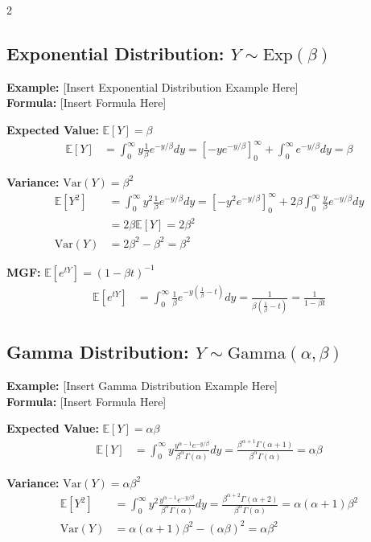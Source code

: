 \documentclass[11pt, letterpaper]{article}
\theoremstyle{definition}
\theoremstyle{remark}
\newcommand{\E}{\mathbb{E}}
\begin{document}
\begin{multicols*}{2}
\subsection{Exponential Distribution: $Y \sim \text{Exp}(\beta)$}
\textbf{Example:} [Insert Exponential Distribution Example Here] \\
\textbf{Formula:} [Insert Formula Here]

\textbf{Expected Value:} $\E[Y] = \beta$
\begin{align*}
\E[Y] &= \int_{0}^{\infty} y \frac{1}{\beta} e^{-y/\beta} dy = \left[ -y e^{-y/\beta} \right]_{0}^{\infty} + \int_{0}^{\infty} e^{-y/\beta} dy = \beta
\end{align*}

\textbf{Variance:} $\text{Var}(Y) = \beta^2$
\begin{align*}
\E[Y^2] &= \int_{0}^{\infty} y^2 \frac{1}{\beta} e^{-y/\beta} dy = \left[ -y^2 e^{-y/\beta} \right]_{0}^{\infty} + 2\beta \int_{0}^{\infty} \frac{y}{\beta} e^{-y/\beta} dy \\
&= 2\beta \E[Y] = 2\beta^2 \\
\text{Var}(Y) &= 2\beta^2 - \beta^2 = \beta^2
\end{align*}

\textbf{MGF:} $\E[e^{tY}] = (1-\beta t)^{-1}$
\begin{align*}
\E[e^{tY}] &= \int_{0}^{\infty} \frac{1}{\beta} e^{-y\left(\frac{1}{\beta}-t\right)} dy = \frac{1}{\beta\left(\frac{1}{\beta}-t\right)} = \frac{1}{1-\beta t}
\end{align*}

\subsection{Gamma Distribution: $Y \sim \text{Gamma}(\alpha, \beta)$}
\textbf{Example:} [Insert Gamma Distribution Example Here] \\
\textbf{Formula:} [Insert Formula Here]

\textbf{Expected Value:} $\E[Y] = \alpha\beta$
\begin{align*}
\E[Y] &= \int_{0}^{\infty} y \frac{y^{\alpha-1} e^{-y/\beta}}{\beta^\alpha \Gamma(\alpha)} dy = \frac{\beta^{\alpha+1} \Gamma(\alpha+1)}{\beta^\alpha \Gamma(\alpha)} = \alpha\beta
\end{align*}

\textbf{Variance:} $\text{Var}(Y) = \alpha\beta^2$
\begin{align*}
\E[Y^2] &= \int_{0}^{\infty} y^2 \frac{y^{\alpha-1} e^{-y/\beta}}{\beta^\alpha \Gamma(\alpha)} dy = \frac{\beta^{\alpha+2} \Gamma(\alpha+2)}{\beta^\alpha \Gamma(\alpha)} = \alpha(\alpha+1)\beta^2 \\
\text{Var}(Y) &= \alpha(\alpha+1)\beta^2 - (\alpha\beta)^2 = \alpha\beta^2
\end{align*}


\end{multicols*}
\end{document}
